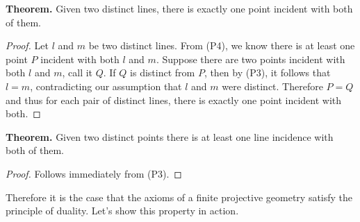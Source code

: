 \documentclass[12pt]{book}
\def\header #1{\noindent\textbf{#1}}
\begin{document}
\header{Theorem.} Given two distinct lines, there is exactly one point incident with both of them.

\begin{proof}
Let $l$ and $m$ be two distinct lines. From (P4), we know there is at least one point $P$ incident with both $l$ and $m$. Suppose there are two points incident with both $l$ and $m$, call it $Q$. If $Q$ is distinct from $P$, then by (P3), it follows that $l=m$, contradicting our assumption that $l$ and $m$ were distinct. Therefore $P=Q$ and thus for each pair of distinct lines, there is exactly one point incident with both.
\end{proof}

\header{Theorem.} Given two distinct points there is at least one line incidence with both of them.

\begin{proof}
Follows immediately from (P3).
\end{proof}

Therefore it is the case that the axioms of a finite projective geometry satisfy the principle of duality. Let's show this property in action.
\end{document}
